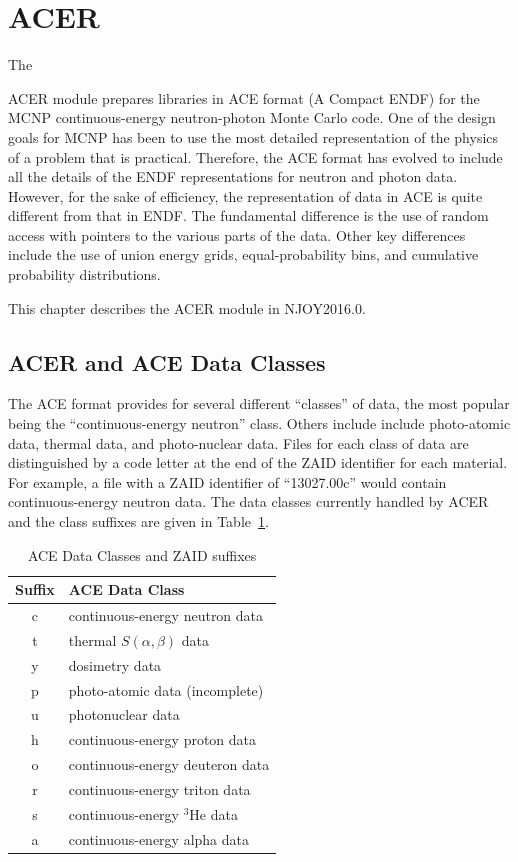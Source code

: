 \section{ACER}
\label{sACER}

\hypertarget{sACERhy}{The}
ACER module prepares libraries in ACE format (A Compact
ENDF) for the MCNP continuous-energy
neutron-photon Monte Carlo code\cite{MCNP}.
One of the design goals for MCNP has been to use the most detailed
representation of the physics of a problem that is practical.
Therefore, the ACE format has evolved to include all the details
of the ENDF\cite{ENDF102} representations for neutron and photon data.
However, for the sake of efficiency, the representation of data in ACE
is quite different from that in ENDF.  The fundamental difference is
the use of random access with pointers to the various parts of the
data.  Other key differences include the use of union energy grids,
equal-probability bins, and cumulative probability distributions.

This chapter describes the ACER module in NJOY2016.0.

\subsection{ACER and ACE Data Classes}
\label{ssACER_classes}

The ACE format provides for several different ``classes'' of data,
the most popular being the ``continuous-energy neutron'' class.
Others include include photo-atomic data, thermal data, and
photo-nuclear data.  Files for each class of data are distinguished
by a code letter at the end of the ZAID identifier for each material.
For example, a file with a ZAID identifier of ``13027.00c'' would
contain continuous-energy neutron data.  The data classes currently
handled by ACER and the class suffixes are given in Table~\ref{classes}.

\begin{table}[b]
\caption[ACE Data Classes and ZAID suffixes]{ACE Data Classes and ZAID suffixes}
\label{classes}
\begin{center}
\begin{tabular}{cl}
Suffix & ACE Data  Class \\
\hline
  c  &  continuous-energy neutron data \\
  t  &  thermal $S(\alpha,\beta)$ data \\
  y  &  dosimetry data \\
  p  &  photo-atomic data (incomplete) \\
  u  &  photonuclear data \\
  h  &  continuous-energy proton data \\
  o  &  continuous-energy deuteron data \\
  r  &  continuous-energy triton data \\
  s  &  continuous-energy $^{3}$He data \\
  a  &  continuous-energy alpha data \\
\hline
\end{tabular}
\end{center}
\end{table}


